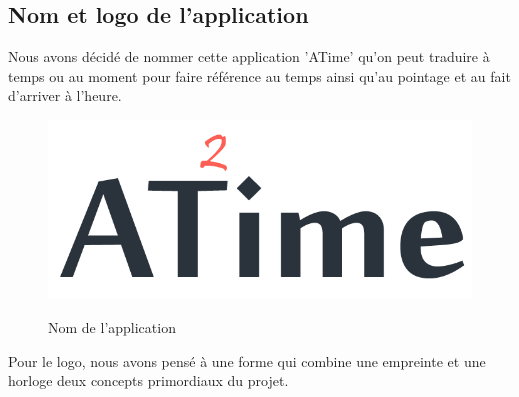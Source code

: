         \subsection{Nom et logo de l'application}
        Nous avons décidé de nommer cette application 'ATime' qu’on peut traduire à temps ou au moment pour faire référence au temps ainsi qu’au pointage et au fait d'arriver à l'heure.
            \begin{figure}[h!]
                        \centering
                        \includegraphics[scale=0.4 ]{images/graphique identity/app_name_dark.png}
                        \label{fig85}
                        \caption{Nom de l'application}
                        \label{}
            \end{figure} 
        Pour le logo, nous avons pensé à une forme qui combine une empreinte et une horloge deux concepts primordiaux du projet.



